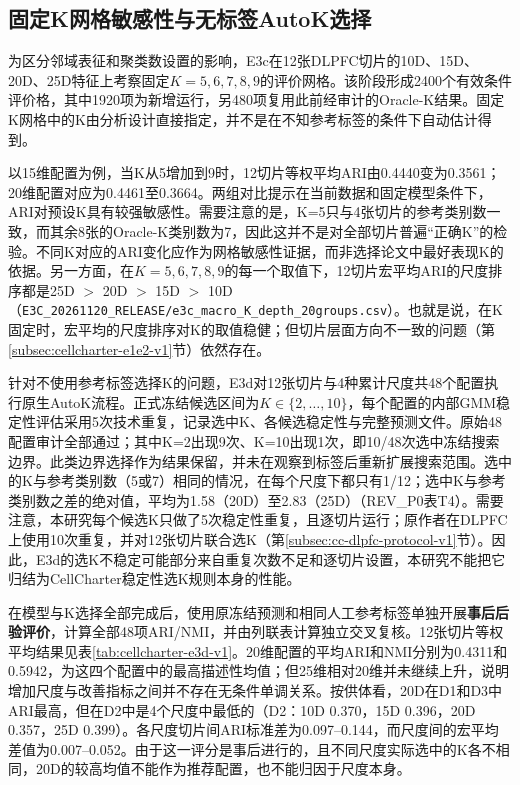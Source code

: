 \subsection{固定K网格敏感性与无标签AutoK选择}
\label{subsec:cellcharter-e3c-e3d-v1}

为区分邻域表征和聚类数设置的影响，E3c在12张DLPFC切片的10D、15D、20D、25D特征上考察固定$K=5,6,7,8,9$的评价网格。该阶段形成2400个有效条件评价格，其中1920项为新增运行，另480项复用此前经审计的Oracle-K结果。固定K网格中的K由分析设计直接指定，并不是在不知参考标签的条件下自动估计得到。

以15维配置为例，当K从5增加到9时，12切片等权平均ARI由0.4440变为0.3561；20维配置对应为0.4461至0.3664。两组对比提示在当前数据和固定模型条件下，ARI对预设K具有较强敏感性。需要注意的是，K=5只与4张切片的参考类别数一致，而其余8张的Oracle-K类别数为7，因此这并不是对全部切片普遍“正确K”的检验。不同K对应的ARI变化应作为网格敏感性证据，而非选择论文中最好表现K的依据。另一方面，在$K=5,6,7,8,9$的每一个取值下，12切片宏平均ARI的尺度排序都是25D $>$ 20D $>$ 15D $>$ 10D（\texttt{E3C\_20261120\_RELEASE/e3c\_macro\_K\_depth\_20groups.csv}）。也就是说，在K固定时，宏平均的尺度排序对K的取值稳健；但切片层面方向不一致的问题（第\ref{subsec:cellcharter-e1e2-v1}节）依然存在。

针对不使用参考标签选择K的问题，E3d对12张切片与4种累计尺度共48个配置执行原生AutoK流程。正式冻结候选区间为$K\in\{2,\ldots,10\}$，每个配置的内部GMM稳定性评估采用5次技术重复，记录选中K、各候选稳定性与完整预测文件。原始48配置审计全部通过；其中K=2出现9次、K=10出现1次，即10/48次选中冻结搜索边界。此类边界选择作为结果保留，并未在观察到标签后重新扩展搜索范围。选中的K与参考类别数（5或7）相同的情况，在每个尺度下都只有1/12；选中K与参考类别数之差的绝对值，平均为1.58（20D）至2.83（25D）（REV\_P0表T4）。需要注意，本研究每个候选K只做了5次稳定性重复，且逐切片运行；原作者在DLPFC上使用10次重复，并对12张切片联合选K（第\ref{subsec:cc-dlpfc-protocol-v1}节）。因此，E3d的选K不稳定可能部分来自重复次数不足和逐切片设置，本研究不能把它归结为CellCharter稳定性选K规则本身的性能。

在模型与K选择全部完成后，使用原冻结预测和相同人工参考标签单独开展\textbf{事后后验评价}，计算全部48项ARI/NMI，并由列联表计算独立交叉复核。12张切片等权平均结果见表\ref{tab:cellcharter-e3d-v1}。20维配置的平均ARI和NMI分别为0.4311和0.5942，为这四个配置中的最高描述性均值；但25维相对20维并未继续上升，说明增加尺度与改善指标之间并不存在无条件单调关系。按供体看，20D在D1和D3中ARI最高，但在D2中是4个尺度中最低的（D2：10D 0.370，15D 0.396，20D 0.357，25D 0.399）。各尺度切片间ARI标准差为0.097--0.144，而尺度间的宏平均差值为0.007--0.052。由于这一评分是事后进行的，且不同尺度实际选中的K各不相同，20D的较高均值不能作为推荐配置，也不能归因于尺度本身。

